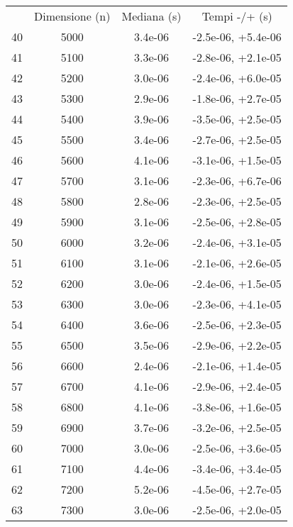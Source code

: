 \begin{table}
\centering
\begin{adjustbox}{width=1\textwidth/2}
\begin{tabular}{|c|c|c|c|}
\hline
 & Dimensione (n) & Mediana (s) & Tempi -/+ (s) \\
40 & 5000 & 3.4e-06 & -2.5e-06, +5.4e-06 \\
\cline{1-4}
41 & 5100 & 3.3e-06 & -2.8e-06, +2.1e-05 \\
\cline{1-4}
42 & 5200 & 3.0e-06 & -2.4e-06, +6.0e-05 \\
\cline{1-4}
43 & 5300 & 2.9e-06 & -1.8e-06, +2.7e-05 \\
\cline{1-4}
44 & 5400 & 3.9e-06 & -3.5e-06, +2.5e-05 \\
\cline{1-4}
45 & 5500 & 3.4e-06 & -2.7e-06, +2.5e-05 \\
\cline{1-4}
46 & 5600 & 4.1e-06 & -3.1e-06, +1.5e-05 \\
\cline{1-4}
47 & 5700 & 3.1e-06 & -2.3e-06, +6.7e-06 \\
\cline{1-4}
48 & 5800 & 2.8e-06 & -2.3e-06, +2.5e-05 \\
\cline{1-4}
49 & 5900 & 3.1e-06 & -2.5e-06, +2.8e-05 \\
\cline{1-4}
50 & 6000 & 3.2e-06 & -2.4e-06, +3.1e-05 \\
\cline{1-4}
51 & 6100 & 3.1e-06 & -2.1e-06, +2.6e-05 \\
\cline{1-4}
52 & 6200 & 3.0e-06 & -2.4e-06, +1.5e-05 \\
\cline{1-4}
53 & 6300 & 3.0e-06 & -2.3e-06, +4.1e-05 \\
\cline{1-4}
54 & 6400 & 3.6e-06 & -2.5e-06, +2.3e-05 \\
\cline{1-4}
55 & 6500 & 3.5e-06 & -2.9e-06, +2.2e-05 \\
\cline{1-4}
56 & 6600 & 2.4e-06 & -2.1e-06, +1.4e-05 \\
\cline{1-4}
57 & 6700 & 4.1e-06 & -2.9e-06, +2.4e-05 \\
\cline{1-4}
58 & 6800 & 4.1e-06 & -3.8e-06, +1.6e-05 \\
\cline{1-4}
59 & 6900 & 3.7e-06 & -3.2e-06, +2.5e-05 \\
\cline{1-4}
60 & 7000 & 3.0e-06 & -2.5e-06, +3.6e-05 \\
\cline{1-4}
61 & 7100 & 4.4e-06 & -3.4e-06, +3.4e-05 \\
\cline{1-4}
62 & 7200 & 5.2e-06 & -4.5e-06, +2.7e-05 \\
\cline{1-4}
63 & 7300 & 3.0e-06 & -2.5e-06, +2.0e-05 \\

\end{tabular}
\end{adjustbox}
\end{table}
